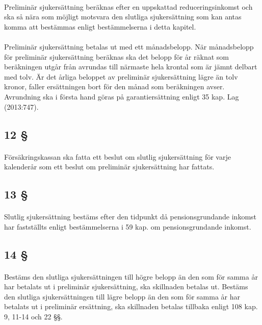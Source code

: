 \documentclass[a4paper,notitlepage,openany,10pt]{book}
\begin{document}
\paragraph*{}
Preliminär sjukersättning beräknas efter en uppskattad reduceringsinkomst och ska så nära som möjligt motsvara den slutliga sjukersättning som kan antas komma att bestämmas enligt bestämmelserna i detta kapitel.
\paragraph*{}
Preliminär sjukersättning betalas ut med ett månadsbelopp.
När månadsbelopp för preliminär sjukersättning beräknas ska det belopp för år räknat som beräkningen utgår från avrundas till närmaste hela krontal som är jämnt delbart med tolv. Är det årliga beloppet av preliminär sjukersättning lägre än tolv kronor, faller ersättningen bort för den månad som beräkningen avser. Avrundning ska i första hand göras på garantiersättning enligt 35 kap.
Lag (2013:747).
\subsection*{12 §}
\paragraph*{}
Försäkringskassan ska fatta ett beslut om slutlig sjukersättning för varje kalenderår som ett beslut om preliminär sjukersättning har fattats.
\subsection*{13 §}
\paragraph*{}
Slutlig sjukersättning bestäms efter den tidpunkt då pensionsgrundande inkomst har fastställts enligt bestämmelserna i 59 kap. om pensionsgrundande inkomst.
\subsection*{14 §}
\paragraph*{}
Bestäms den slutliga sjukersättningen till högre belopp än den som för samma år har betalats ut i preliminär sjukersättning, ska skillnaden betalas ut. Bestäms den slutliga sjukersättningen till lägre belopp än den som för samma år har betalats ut i preliminär ersättning, ska skillnaden betalas tillbaka enligt 108 kap. 9, 11-14 och 22 §§.
\end{document}
